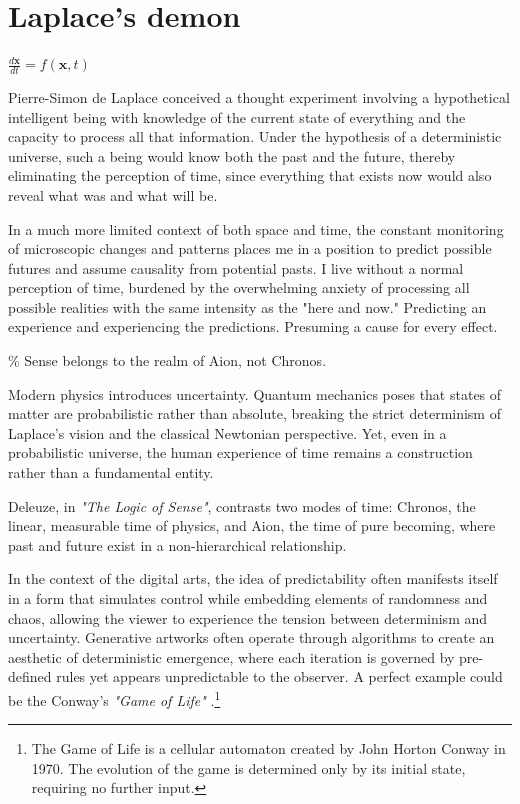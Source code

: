 \chapter*{Laplace's demon}
\begin{center}
\vspace{2cm}
\begin{flushright}
\large
\textit{$\frac{d\mathbf{x}}{dt} = f(\mathbf{x}, t)$ }
\end{flushright}
\vspace{2cm}
\end{center}
\normalsize

\newpage
Pierre-Simon de Laplace conceived a thought experiment involving a hypothetical intelligent being with knowledge of the current state of everything and the capacity to process all that information. Under the hypothesis of a deterministic universe, such a being would know both the past and the future, thereby eliminating the perception of time, since everything that exists now would also reveal what was and what will be.

In a much more limited context of both space and time, the constant monitoring of microscopic changes and patterns places me in a position to predict possible futures and assume causality from potential pasts. I live without a normal perception of time, burdened by the overwhelming anxiety of processing all possible realities with the same intensity as the "here and now." Predicting an experience and experiencing the predictions. Presuming a cause for every effect. 

{\scriptsize \textcolor{comment}{\% Sense belongs to the realm of Aion, not Chronos. }}

Modern physics introduces uncertainty. Quantum mechanics poses that states of matter are probabilistic rather than absolute, breaking the strict determinism of Laplace's vision and the classical Newtonian perspective. Yet, even in a probabilistic universe, the human experience of time remains a construction rather than a fundamental entity.

Deleuze, in \textit{"The Logic of Sense"}, contrasts two modes of time: Chronos, the linear, measurable time of physics, and Aion, the time of pure becoming, where past and future exist in a non-hierarchical relationship.\citep{deleuze1969}

In the context of the digital arts, the idea of predictability often manifests itself in a form that simulates control while embedding elements of randomness and chaos, allowing the viewer to experience the tension between determinism and uncertainty. Generative artworks often operate through algorithms to create an aesthetic of deterministic emergence, where each iteration is governed by pre-defined rules yet appears unpredictable to the observer. A perfect example could be the Conway's \textit{"Game of Life"} \citep{wiki:gol}.\footnote{The Game of Life is a cellular automaton created by John Horton Conway in 1970. The evolution of the game is determined only by its initial state, requiring no further input.}

